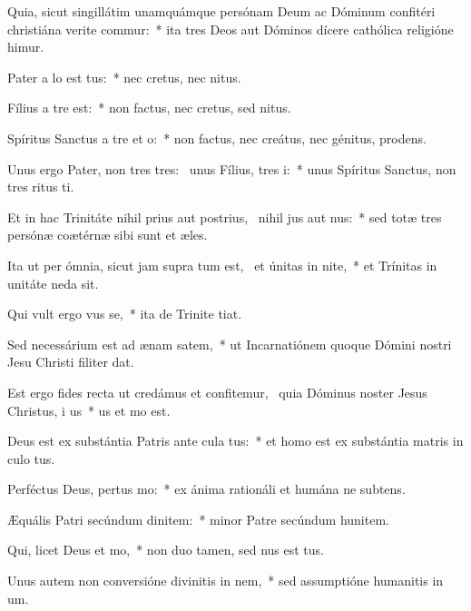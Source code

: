 \item Quia, sicut singillátim unamquámque persónam Deum ac Dóminum confitéri christiána verite commur:~* ita tres Deos aut Dóminos dícere cathólica religióne himur.
\item Pater a lo est tus:~* nec cretus, nec nitus.
\item Fílius a tre  est:~* non factus, nec cretus, sed nitus.
\item Spíritus Sanctus a tre et o:~* non factus, nec creátus, nec génitus,  prodens.
\item Unus ergo Pater, non tres tres:~\pscross{} unus Fílius,  tres i:~* unus Spíritus Sanctus, non tres ritus ti.
\item Et in hac Trinitáte nihil prius aut postrius,~\pscross{} nihil jus aut nus:~* sed totæ tres persónæ coætérnæ sibi sunt et æles.
\item Ita ut per ómnia, sicut jam supra tum est,~\pscross{} et únitas in nite,~* et Trínitas in unitáte neda sit.
\item Qui vult ergo vus se,~* ita de Trinite tiat.
\item Sed necessárium est ad ænam satem,~* ut Incarnatiónem quoque Dómini nostri Jesu Christi filiter dat.
\item Est ergo fides recta ut credámus et confitemur,~\pscross{} quia Dóminus noster Jesus Christus, i us~* us et mo est.
\item Deus est ex substántia Patris ante cula tus:~* et homo est ex substántia matris in culo tus.
\item Perféctus Deus, pertus mo:~* ex ánima rationáli et humána ne subtens.
\item Æquális Patri secúndum dinitem:~* minor Patre secúndum hunitem.
\item Qui, licet Deus  et mo,~* non duo tamen, sed nus est tus.
\item Unus autem non conversióne divinitis in nem,~* sed assumptióne humanitis in um.
